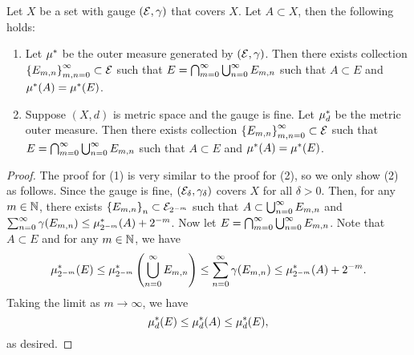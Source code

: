 \documentclass[a4paper]{article}
\begin{document}
\begin{lemma}
  Let $X$ be a set with gauge $(\mathcal{E}, \gamma)$ that covers 
  $X$. Let $A \subset X$, then the following holds:
  \begin{enumerate}
    \item Let $\mu^*$ be the outer measure generated 
    by $(\mathcal{E}, \gamma)$. Then there exists collection 
    $\left\{ E_{m,n} \right\}_{m, n= 0}^\infty \subset \mathcal{E}$
    such that $E = \bigcap_{m=0}^\infty \bigcup_{n=0}^\infty E_{m, n}$ such that 
    $A \subset E$ and $\mu^*(A) = \mu^*(E)$. 

    \item Suppose $(X, d)$ is metric space and the gauge is 
    fine.
    Let $\mu^*_d$ be the metric outer measure. Then there exists collection 
    $\left\{ E_{m,n} \right\}_{m, n= 0}^\infty \subset \mathcal{E}$
    such that $E = \bigcap_{m=0}^\infty \bigcup_{n=0}^\infty E_{m, n}$ such that 
    $A \subset E$ and $\mu^*(A) = \mu^*(E)$. 
  \end{enumerate}
\end{lemma}

\begin{proof}
The proof for (1) is very similar to the proof for (2), 
so we only show (2) as follows.
Since the gauge is fine, $(\mathcal{E}_\delta, \gamma_\delta)$
covers $X$ for all $\delta > 0$. Then, for any $m \in \mathbb{N}$,
there exists $\left\{ E_{m, n} \right\}_{n} \subset 
\mathcal{E}_{2^{-m}}$ such that $A \subset \bigcup_{n=0}^\infty E_{m, n}$ 
and $\sum_{n=0}^\infty \gamma(E_{m, n}) \leq \mu^*_{2^{-m}}(A) + 2^{-m}$. 
Now let $E = \bigcap_{m=0}^\infty \bigcup_{n=0}^\infty E_{m, n}$. Note that 
$A \subset E$ and for any $m \in \mathbb{N}$, we have 
\[
\mu^*_{2^{-m}} (E) \leq \mu^*_{2^{-m}} \left( \bigcup_{n=0}^\infty E_{m, n} \right) 
\leq \sum_{n=0}^\infty \gamma(E_{m, n}) \leq \mu^*_{2^{-m}} (A) + 2^{-m}.
\]
Taking the limit as $m \to \infty$, we have 
\[
\mu^*_d (E) \leq \mu^*_d(A) \leq \mu^*_d(E),
\]
as desired.
\end{proof}
\end{document}

